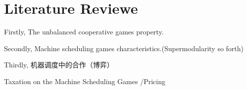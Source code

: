 \section{Literature Reviewe}
\cite{caprara2010new}
\cite{liu2018simultaneous}
\cite{schulz2010sharing}
\cite{bachrach2009cost}
\cite{bondareva1963some}
\cite{cai2012coordination}
\cite{goemans2004cooperative}
\cite{aydinliyim2010coordination}
\cite{curiel1989sequencing}
\cite{jain2007cost}
\cite{liu2009complexity}
\cite{liu2016computing}

Firstly, The unbalanced cooperative games property.

Secondly, Machine scheduling games characteristics.(Supermodularity so forth)

Thirdly, 机器调度中的合作（博弈）

Taxation on the Machine Scheduling Games /Pricing
